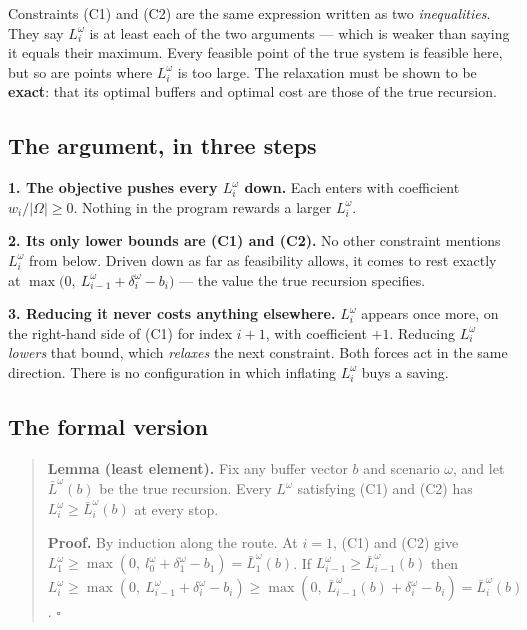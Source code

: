 \documentclass[11pt,a4paper]{article}
\begin{document}
Constraints (C1) and (C2) are the same expression written as two \emph{inequalities}. They
say $L_i^\omega$ is at least each of the two arguments --- which is weaker than saying it
equals their maximum. Every feasible point of the true system is feasible here, but so are
points where $L_i^\omega$ is too large. The relaxation must be shown to be \textbf{exact}:
that its optimal buffers and optimal cost are those of the true recursion.

\subsection*{The argument, in three steps}

\begin{keybox}
\textbf{1. The objective pushes every $L_i^\omega$ down.} Each enters with coefficient
$w_i/|\Omega| \ge 0$. Nothing in the program rewards a larger $L_i^\omega$.

\medskip
\textbf{2. Its only lower bounds are (C1) and (C2).} No other constraint mentions
$L_i^\omega$ from below. Driven down as far as feasibility allows, it comes to rest exactly
at $\max\bigl(0,\ L_{i-1}^\omega + \delta_i^\omega - b_i\bigr)$ --- the value the true
recursion specifies.

\medskip
\textbf{3. Reducing it never costs anything elsewhere.} $L_i^\omega$ appears once more, on
the right-hand side of (C1) for index $i+1$, with coefficient $+1$. Reducing $L_i^\omega$
\emph{lowers} that bound, which \emph{relaxes} the next constraint. Both forces act in the
same direction. There is no configuration in which inflating $L_i^\omega$ buys a saving.
\end{keybox}

\subsection*{The formal version}

\begin{quote}
\textbf{Lemma (least element).} Fix any buffer vector $b$ and scenario $\omega$, and let
$\bar L^\omega(b)$ be the true recursion. Every $L^\omega$ satisfying (C1) and (C2) has
$L_i^\omega \ge \bar L_i^\omega(b)$ at every stop.

\textbf{Proof.} By induction along the route. At $i = 1$, (C1) and (C2) give
$L_1^\omega \ge \max(0,\ l_0^\omega + \delta_1^\omega - b_1) = \bar L_1^\omega(b)$. If
$L_{i-1}^\omega \ge \bar L_{i-1}^\omega(b)$ then
$L_i^\omega \ge \max(0,\ L_{i-1}^\omega + \delta_i^\omega - b_i)
\ge \max(0,\ \bar L_{i-1}^\omega(b) + \delta_i^\omega - b_i) = \bar L_i^\omega(b)$.
\hfill$\square$
\end{quote}
\end{document}
